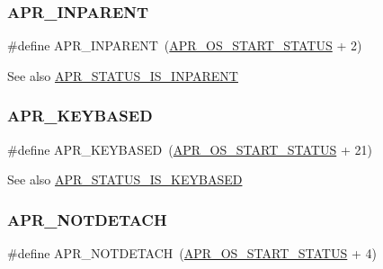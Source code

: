\subsubsection{\texorpdfstring{A\+P\+R\+\_\+\+I\+N\+P\+A\+R\+E\+NT}{APR\_INPARENT}}
{\footnotesize\ttfamily \#define A\+P\+R\+\_\+\+I\+N\+P\+A\+R\+E\+NT~(\mbox{\hyperlink{group__apr__errno_ga450e1a5734732e092ddaa5b67414f69b}{A\+P\+R\+\_\+\+O\+S\+\_\+\+S\+T\+A\+R\+T\+\_\+\+S\+T\+A\+T\+US}} + 2)}

\begin{DoxySeeAlso}{See also}
\mbox{\hyperlink{group___a_p_r___s_t_a_t_u_s___i_s_ga4471f8de6eda3a673aa1f306114c012e}{A\+P\+R\+\_\+\+S\+T\+A\+T\+U\+S\+\_\+\+I\+S\+\_\+\+I\+N\+P\+A\+R\+E\+NT}} 
\end{DoxySeeAlso}
\mbox{\label{group___a_p_r___error_gaac52bebace264494fa94cdf0b4344d26}} 
\subsubsection{\texorpdfstring{A\+P\+R\+\_\+\+K\+E\+Y\+B\+A\+S\+ED}{APR\_KEYBASED}}
{\footnotesize\ttfamily \#define A\+P\+R\+\_\+\+K\+E\+Y\+B\+A\+S\+ED~(\mbox{\hyperlink{group__apr__errno_ga450e1a5734732e092ddaa5b67414f69b}{A\+P\+R\+\_\+\+O\+S\+\_\+\+S\+T\+A\+R\+T\+\_\+\+S\+T\+A\+T\+US}} + 21)}

\begin{DoxySeeAlso}{See also}
\mbox{\hyperlink{group___a_p_r___s_t_a_t_u_s___i_s_gaf43f4a40f5ab2fe196acb4e12f20b79e}{A\+P\+R\+\_\+\+S\+T\+A\+T\+U\+S\+\_\+\+I\+S\+\_\+\+K\+E\+Y\+B\+A\+S\+ED}} 
\end{DoxySeeAlso}
\mbox{\label{group___a_p_r___error_ga83b8407fb5de5840f51dfd2c1439987b}} 
\subsubsection{\texorpdfstring{A\+P\+R\+\_\+\+N\+O\+T\+D\+E\+T\+A\+CH}{APR\_NOTDETACH}}
{\footnotesize\ttfamily \#define A\+P\+R\+\_\+\+N\+O\+T\+D\+E\+T\+A\+CH~(\mbox{\hyperlink{group__apr__errno_ga450e1a5734732e092ddaa5b67414f69b}{A\+P\+R\+\_\+\+O\+S\+\_\+\+S\+T\+A\+R\+T\+\_\+\+S\+T\+A\+T\+US}} + 4)}

